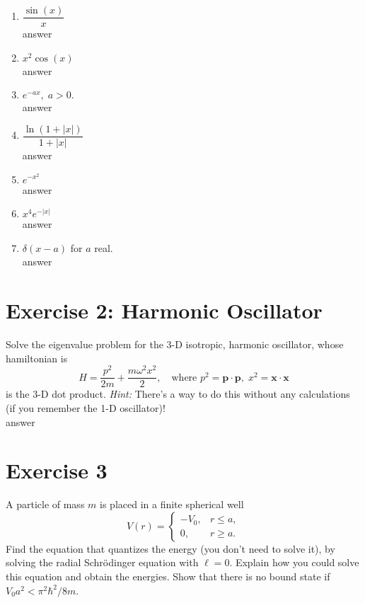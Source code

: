\documentclass[11pt]{article}
\begin{document}
\begin{enumerate}[label=\alph*)]
\begin{enumerate}[label=\roman*)]
\item $\dfrac{\sin(x)}{x}$\\

	answer

\item $x^{2}\cos(x)$\\

	answer

\item $e^{-ax}, \; a > 0.$\\

	answer

\item $\dfrac{\ln(1+|x|)}{1+|x|}$\\

	answer

\item $e^{-x^{2}}$\\

	answer

\item $x^{4}e^{-|x|}$\\

	answer

\item $\delta(x-a)$ for $a$ real.\\

	answer
\end{enumerate}

\end{enumerate}

\section*{Exercise 2: Harmonic Oscillator}
Solve the eigenvalue problem for the 3-D isotropic, harmonic oscillator, whose hamiltonian is 
\[
H = \frac{p^2}{2m} + \frac{m\omega^2 x^2}{2}, \quad \text{where } p^2 = \mathbf{p}\cdot \mathbf{p}, \; x^2 = \mathbf{x}\cdot \mathbf{x}
\]
is the 3-D dot product.  
\emph{Hint:} There’s a way to do this without any calculations (if you remember the 1-D oscillator)!\\

answer

\section*{Exercise 3}
A particle of mass $m$ is placed in a finite spherical well
\[
V(r) = \begin{cases}
 -V_0, & r \leq a, \\
 0, & r \geq a .
\end{cases}
\]
Find the equation that quantizes the energy (you don’t need to solve it), by solving the radial Schrödinger equation with $\ell = 0$. Explain how you could solve this equation and obtain the energies. Show that there is no bound state if $V_0 a^2 < \pi^2 \hbar^2 / 8m$.  
\end{document}
